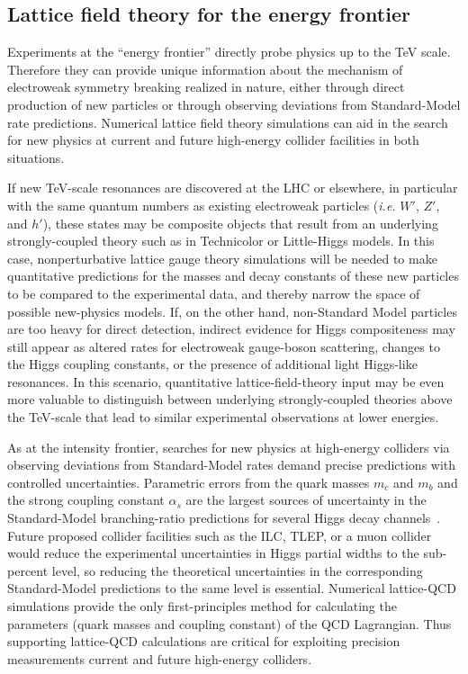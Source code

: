 \subsection{Lattice field theory for the energy frontier}
\label{subsec:lqcd:EF}

Experiments at the ``energy frontier'' directly probe physics up to the TeV
scale.  Therefore they can provide unique information about the mechanism of
electroweak symmetry breaking realized in nature, either through direct
production of new particles or through observing deviations from
Standard-Model rate predictions.  Numerical lattice field theory simulations
can aid in the search for new physics at current and future high-energy
collider facilities in both situations.

If new TeV-scale resonances are discovered at the LHC or elsewhere, in
particular with the same quantum numbers as existing electroweak particles
({\it i.e.} $W'$, $Z'$, and $h'$), these states may be composite objects that
result from an underlying strongly-coupled theory such as in Technicolor or
Little-Higgs models.  In this case, nonperturbative lattice gauge theory
simulations will be needed to make quantitative predictions for the masses and
decay constants of these new particles to be compared to the experimental
data, and thereby narrow the space of possible new-physics models.  If, on the
other hand, non-Standard Model particles are too heavy for direct detection,
indirect evidence for Higgs compositeness may still appear as altered rates
for electroweak gauge-boson scattering, changes to the Higgs coupling
constants, or the presence of additional light Higgs-like resonances.  In this
scenario, quantitative lattice-field-theory input may be even more valuable to
distinguish between underlying strongly-coupled theories above the TeV-scale
that lead to similar experimental observations at lower energies.

As at the intensity frontier, searches for new physics at high-energy
colliders via observing deviations from Standard-Model rates demand precise
predictions with controlled uncertainties.  Parametric errors from the quark
masses $m_c$ and $m_b$ and the strong coupling constant $\alpha_s$ are the
largest sources of uncertainty in the Standard-Model branching-ratio
predictions for several Higgs decay channels~\cite{Denner:2011mq}.  Future
proposed collider facilities such as the ILC, TLEP, or a muon collider would
reduce the experimental uncertainties in Higgs partial widths to the
sub-percent level, so reducing the theoretical uncertainties in the
corresponding Standard-Model predictions to the same level is essential.
Numerical lattice-QCD simulations provide the only first-principles method for
calculating the parameters (quark masses and coupling constant) of the QCD
Lagrangian.  Thus supporting lattice-QCD calculations are critical for
exploiting precision measurements current and future high-energy colliders.

